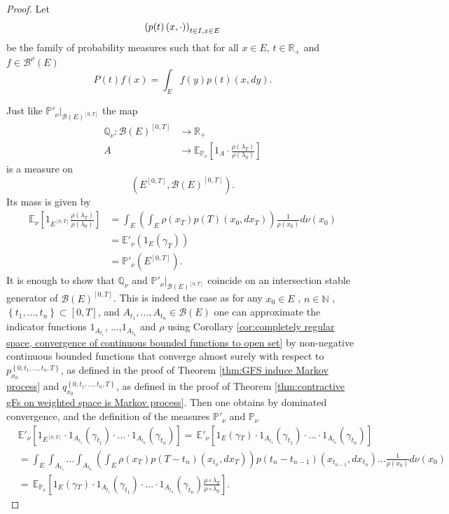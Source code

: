 \documentclass[a4paper,12pt]{article}
\theoremstyle{definition}
\theoremstyle{remark}
\numberwithin{equation}{section}
\numberwithin{theorem}{section}
\begin{document}
\begin{proof}
 Let
\[
\left(p(t)\left(x,\cdot\right)\right)_{t\in I,x\text{\ensuremath{\in}}E}
\]
 be the family of probability measures such that for all $x\in E$, $t\in\mathbb{R}_{+}$ and $f\in\mathcal{\mathscr{B}}^{\rho}(E)$
\[
P(t)f(x)=\int_{E}f(y)p(t)(x,dy).
\]

Just like $\left.\mathbb{P}'_{\nu}\right|_{\mathcal{B}(E)^{\left[0,T\right]}}$
the map 
\begin{align*}
\mathbb{Q}_{\nu}: \mathcal{B}(E)^{\left[0,T\right]} & \rightarrow \mathbb{R}_+\\
A &\rightarrow\mathbb{E}_{\mathbb{P}{}_{\nu}}\left[1_{A}\cdot\frac{\rho(\lambda_{T})}{\rho(\lambda_{0})}\right]
\end{align*}
is a measure on 
\[
\left(E^{\left[0,T\right]},\mathcal{B}(E)^{\left[0,T\right]}\right).
\]
 Its mass is given by
\begin{align*}
\mathbb{E}_{\nu}\left[1_{E^{\left[0,T\right]}}\frac{\rho(\lambda_{T})}{\rho(\lambda_{0})}\right] & =\int_{E}\left(\int_{E}\rho(x_{T})p(T)(x_{0},dx_{T})\right)\frac{1}{\rho(x_{0})}d\nu(x_{0})\\
 & =\mathbb{E}'_{\nu}(1_{E}(\gamma_{T}))\\
 & =\mathbb{P}'_{\nu}(E^{\left[0,T\right]}).
\end{align*}
It is enough to show that $\mathbb{Q}_{\nu}$ and $\left.\mathbb{P}'_{\nu}\right|_{\mathcal{B}(E)^{\left[0,T\right]}}$
coincide on an intersection stable generator of $\mathcal{B}(E)^{\left[0,T\right]}$.
This is indeed the case as for any $x_{0}\in E$ , $n\in\mathbb{N}$
, $\left\{ t_{1},...,t_{n}\right\} \subset\left[0,T\right]$, and $A_{t_{1}},...,A_{t_{n}}\in\mathcal{B}(E)$
one can approximate the indicator functions $1_{A_{t_{1}}}$, ...,$1_{A_{t_{n}}}$
and $\rho$ using Corollary \ref{cor:completely regular space, convergence of continuous bounded functions to open set}
by non-negative continuous bounded functions that converge almost
surely with respect to $p_{x_{0}}^{\left\{ 0,t_{1},...,t_{n},T\right\} }$,
as defined in the proof of Theorem \ref{thm:GFS induce Markov process}
and $q_{x_{0}}^{\left\{ 0,t_{1},...,t_{n},T\right\} }$, as defined
in the proof of Theorem \ref{thm:contractive gFs on weighted space is Markov process}.
Then one obtains by dominated convergence, and the definition of the
measures $\mathbb{P}'_{\nu}$ and $\mathbb{P}{}_{\nu}$ 
\begin{align*}
 & \mathbb{E}'_{\nu}\left[1_{E^{\left[0,T\right]}}\cdot1_{A_{t_{1}}}(\gamma_{t_{1}})\cdot...\cdot1_{A_{t_{n}}}(\gamma_{t_{n}})\right]
 =\, \mathbb{E}'_{\nu}\left[1_{E}(\gamma{}_{T})\cdot1_{A_{t_{1}}}(\gamma_{t_{1}})\cdot...\cdot1_{A_{t_{n}}}(\gamma_{t_{n}})\right]\\
& =\int_{E}\int_{A_{t_{1}}}...\int_{A_{t_{n}}}\left(\int_{E}\rho(x_{T})p(T-t_{n})(x_{t_{n}},dx_{T})\right)p(t_{n}-t_{n-1})(x_{t_{n-1}},dx_{t_{n}})...\frac{1}{\rho(x_{0})}d\nu(x_{0})\\
 &=\, \mathbb{E}_{\mathbb{P}{}_{\nu}}\left[1_{E}(\gamma{}_{T})\cdot1_{A_{t_{1}}}(\gamma_{t_{1}})\cdot...\cdot1_{A_{t_{n}}}(\gamma_{t_{n}})\frac{\rho\circ\lambda_{T}}{\rho\circ\lambda_{0}}\right].
\end{align*}
\end{proof}
\end{document}
